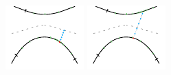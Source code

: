 \begin{figure}[!htb]
  \centering
  \begin{minipage}{.33\textwidth}
      \includegraphics[width=\linewidth]{figs/admissibility_motivation2.pdf}
  \end{minipage}\hfill
  \begin{minipage}{.33\textwidth}
    \includegraphics[width=\linewidth]{figs/admissibility_motivation1.pdf}
  \end{minipage}\hfill
  \begin{minipage}{.33\textwidth}

\end{minipage}
\end{figure}
